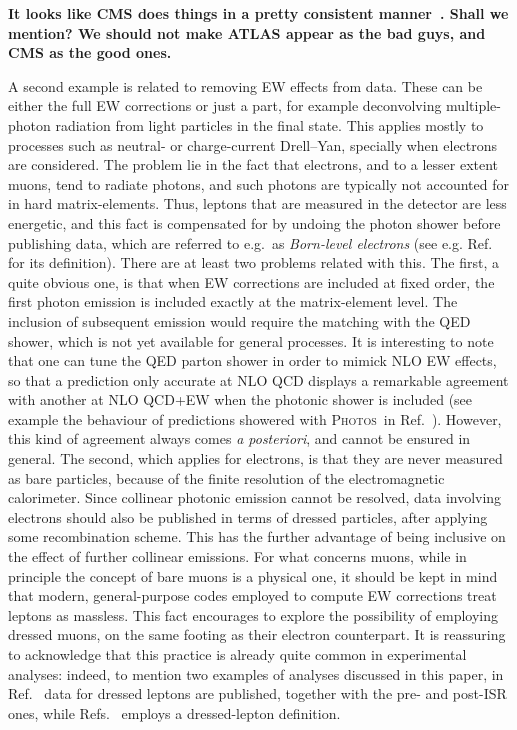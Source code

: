 {\bf It looks like CMS does things in a pretty consistent manner~\cite{Sirunyan:2018owv, CMS:2014jea}. Shall we mention? We should
not make ATLAS appear as the bad guys, and CMS as the good ones.} 

A second example is related to removing EW effects from data. These can be either the full EW corrections
or just a part, for example deconvolving multiple-photon radiation from light particles in the final state. This applies mostly
to processes such as neutral- or charge-current Drell--Yan, specially when electrons are considered. The problem lie in the fact that
 electrons, and to a lesser extent muons, tend to radiate photons, and such photons are typically not accounted
for in hard matrix-elements. Thus, leptons that are measured in the detector are less energetic, and this fact is compensated for
by undoing the photon shower before publishing data, which are referred to e.g.\ as \emph{Born-level electrons} (see e.g. Ref.~\cite{Aad:2015auj} for
its definition). There are at least two 
problems related with this. The first, a quite obvious one, is that when EW corrections
are included at fixed order, the first photon emission is included exactly at the matrix-element level. The inclusion of 
subsequent emission would require the matching with the QED shower, which is not yet available for general processes. It is interesting
to note that one can tune the QED parton shower in order to mimick NLO EW effects, so that a prediction only accurate at NLO
QCD displays a remarkable agreement with another at NLO QCD+EW when the photonic shower is included (see example the behaviour of predictions showered with
\textsc{Photos}~\cite{Barberio:1990ms,Barberio:1993qi,Golonka:2005pn}in Ref.~\cite{CarloniCalame:2016ouw}). However, this kind of agreement
always comes \emph{a posteriori}, and cannot be ensured in general. The second, which
applies for electrons, is that they are never measured as bare particles, because of the finite resolution 
of the electromagnetic calorimeter. Since collinear photonic emission cannot be resolved, data 
involving electrons should also be published
in terms of dressed particles, after applying some recombination scheme. This has the further advantage of being 
inclusive on the effect of further collinear emissions. For what concerns muons, while in principle
the concept of bare muons is a physical one, it should be kept in mind that modern, general-purpose codes employed to
compute EW corrections treat leptons as massless. This fact encourages to explore the possibility of employing dressed
muons, on the same footing as their electron counterpart. It is reassuring to acknowledge that this practice is already quite common in experimental analyses:
indeed, to mention two examples of analyses discussed in this paper, in Ref.~\cite{Aad:2015auj} data for dressed leptons are published, together with the pre- and post-ISR ones, while Refs.~\cite{Sirunyan:2019bzr} employs a dressed-lepton definition.

